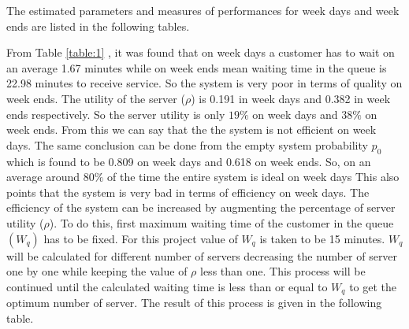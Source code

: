\documentclass{article}
\theoremstyle{definition}
\begin{document}
The estimated parameters and measures of performances for week days and week ends are listed in the following tables.
\begin{center}
\label{table:1}
\end{center}


From Table \ref{table:1} , it was found that on week days a customer has to wait on an average 1.67 minutes while on week ends mean waiting time in the queue is 22.98 minutes to receive service. So the system is very poor in terms of quality on week ends. The utility of the server ($\rho$) is 0.191 in week days and 0.382 in week ends respectively. So the server utility is only $19\%$ on week days and $38\%$ on week ends. From this we can say that the the system is not efficient on week days. The same conclusion can be done from the empty system probability $p_{0}$ which is found to be 0.809 on week days and 0.618 on week ends. So, on an average around $80\%$ of the time the entire system is ideal on week days This also points that the system is very bad in terms of efficiency on week days.
	The efficiency of the system can be increased by augmenting the percentage of server utility ($\rho$). To do this, first maximum waiting time of the customer in the queue $(W_{q})$ has to be fixed. For this project value of $W_{q}$ is taken to be 15 minutes. $W_{q}$ will be calculated for different number of servers decreasing the number of server one by one while keeping the value of $\rho$ less than one. This process will be continued until the calculated waiting time is less than or equal to  $W_{q}$ to get the optimum number of server. The result of this process is given in the following table.
\end{document}
